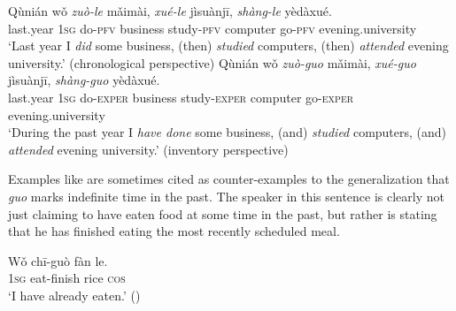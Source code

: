 \ea \label{ex:22.33}

\ea \gll  Qùnián  wǒ  \textit{zuò-le}  mǎimài,  \textit{xué-le}  jìsuànjī,  \textit{shàng-le}  yèdàxué.\\
last.year  \textsc{1sg}  do-\textsc{pfv}  business  study-\textsc{pfv}  computer  go-\textsc{pfv}  evening.university\\
\glt ‘Last year I \textit{did} some business, (then) \textit{studied} computers, (then) \textit{attended} evening university.’ (chronological perspective)
\ex \gll  Qùnián  wǒ  \textit{zuò-guo}  mǎimài,  \textit{xué-guo}  jìsuànjī,  \textit{shàng-guo}  yèdàxué.\\
last.year  \textsc{1sg}  do-\textsc{exper}  business  study-\textsc{exper}  computer  go-\textsc{exper}  evening.university\\
\glt ‘During the past year I \textit{have done} some business, (and) \textit{studied} computers, (and) \textit{attended} evening university.’ (inventory perspective)
\z \z


Examples like  are sometimes cited as counter-examples to the generalization that \textit{guo} marks indefinite time in the past. The speaker in this sentence is clearly not just claiming to have eaten food at some time in the past, but rather is stating that he has finished eating the most recently scheduled meal.


\ea \label{ex:22.34}
\gll Wǒ  chī-guò  fàn  le.\\
\textsc{1sg}  eat-finish  rice  \textsc{cos}{\footnotemark}\\
\glt ‘I have already eaten.’  (\citealt{Ma1977})
\z
{}

